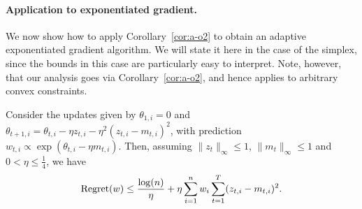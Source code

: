 \documentclass[paper_icml.tex]{subfiles}
\begin{document}
\paragraph{Application to exponentiated gradient.} We now show how to apply 
Corollary~\ref{cor:a-o2} to obtain an adaptive exponentiated gradient algorithm. 
We will state it here in the case of the simplex, since the bounds in this 
case are particularly easy to interpret. Note, however, that our analysis 
goes via Corollary~\ref{cor:a-o2}, and hence applies to arbitrary convex 
constraints.
\begin{proposition}
\label{prop:aeg}
Consider the updates given by $\theta_{1,i} = 0$ and 
$\theta_{t+1,i} = \theta_{t,i} - \eta z_{t,i} - \eta^2 (z_{t,i} - m_{t,i})^2$, 
with prediction $w_{t,i} \propto \exp(\theta_{t,i} - \eta m_{t,i})$. Then, 
assuming $\|z_t\|_{\infty} \leq 1$, $\|m_t\|_{\infty} \leq 1$ and 
$0 < \eta \leq \frac{1}{4}$, we have
\begin{equation}
\operatorname{Regret}(w) \leq \frac{\log(n)}{\eta} + \eta \sum_{i=1}^n w_i \sum_{t=1}^T (z_{t,i} - m_{t,i})^2.
\end{equation}
\end{proposition}
\end{document}
